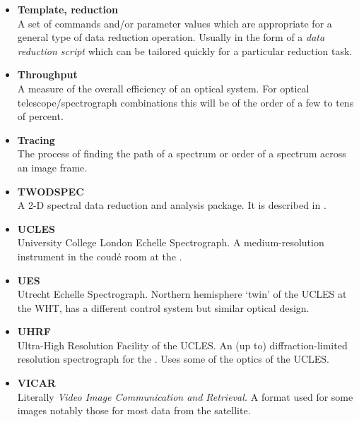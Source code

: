 {{\begin{itemize}
\item {\bf\label{gl_template_reduct}Template, reduction}\\
      A set of commands and/or parameter values which are appropriate for a
      general type of data reduction operation.  Usually in the form of a
      {\sl data reduction script} which can be tailored quickly for a
      particular reduction task.

\item {\bf\label{gl_throughput}Throughput}\\
      A measure of the overall efficiency of an optical system.
      For optical telescope/spectrograph combinations this will be of
      the order of a few to tens of percent.

\item {\bf\label{gl_tracing}Tracing}\\
      The process of finding the path of a spectrum or order of a spectrum
      across an image frame.

\item {\bf\label{gl_twodspec}TWODSPEC}\\
      A 2-D spectral data reduction and analysis package. It is described in 
      .

\item {\bf\label{gl_ucles}UCLES}\\
      University College London Echelle Spectrograph.
      A medium-resolution instrument in the coud\'{e} room at the
      .

\item {\bf\label{gl_ues}UES}\\
      Utrecht Echelle Spectrograph.
      Northern hemisphere `twin' of the UCLES at the WHT, has a
      different control system but similar optical design.

\item {\bf\label{gl_uhrf}UHRF}\\
      Ultra-High Resolution Facility of the UCLES.  An (up to)
      diffraction-limited resolution spectrograph for the
      \@.
      Uses some of the optics of the UCLES.

\item {\bf\label{gl_vicar}VICAR}\\
      Literally {\sl Video Image Communication and Retrieval.}
      A format used for some images notably those for most data
      from the  satellite.


\end{itemize}}}
